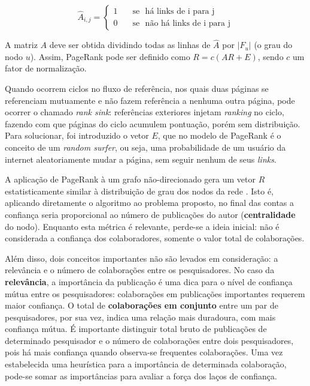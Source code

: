 \documentclass[12pt]{article}
\begin{document}
\begin{equation} \label{eqn:adjacency-matrix}
   \hat{A}_{i,j} =
    \begin{cases}
      1       & \quad \text{se } \text{ há links de i para j}\\
      0       & \quad \text{se } \text{ não há links de i para j}
    \end{cases}
\end{equation}

A matriz $A$ deve ser obtida dividindo todas as linhas de $\hat{A}$ por $|F_u|$ (o grau do nodo $u$). Assim, PageRank pode ser definido 
como $R = c(AR + E)$, sendo $c$ um fator de normalização.

Quando ocorrem ciclos no fluxo de referência, nos quais duas páginas se referenciam mutuamente e não fazem referência a nenhuma 
outra página, pode ocorrer o chamado \textit{rank sink}: referências exteriores injetam \textit{ranking} no ciclo, 
fazendo com que páginas do ciclo acumulem pontuação, porém sem distribuição. Para solucionar, foi introduzido o vetor $E$, que no modelo 
de PageRank é o conceito de um \textit{random surfer}, ou seja, uma probabilidade de um usuário da internet aleatoriamente mudar a 
página, sem seguir nenhum de seus \textit{links}. \cite{page1999pagerank}

A aplicação de PageRank à um grafo não-direcionado gera um vetor $R$ estatisticamente similar à distribuição de grau dos nodos da 
rede \cite{perra2008spectral}. Isto é, aplicando diretamente o algoritmo ao problema proposto, no final das contas a confiança 
seria proporcional ao número de publicações do autor (\textbf{centralidade} do nodo). Enquanto esta métrica é relevante, perde-se 
a ideia inicial: não é considerada a confiança dos colaboradores, somente o valor total de colaborações. 

Além disso, dois conceitos importantes não são levados em consideração: a relevância e o número de colaborações entre os 
pesquisadores. No caso da \textbf{relevância}, a importância da publicação é uma dica para o nível de confiança mútua entre os 
pesquisadores: colaborações em publicações importantes requerem maior confiança. O total de \textbf{colaborações em conjunto} 
entre um par de pesquisadores, por sua vez, indica uma relação mais duradoura, com mais confiança mútua. É importante distinguir 
total bruto de publicações de determinado pesquisador e o número de colaborações entre dois pesquisadores, pois há mais confiança 
quando observa-se frequentes colaborações.  Uma vez estabelecida uma heurística para a importância de determinada colaboração, 
pode-se somar as importâncias para avaliar a força dos laços de confiança.
\end{document}
